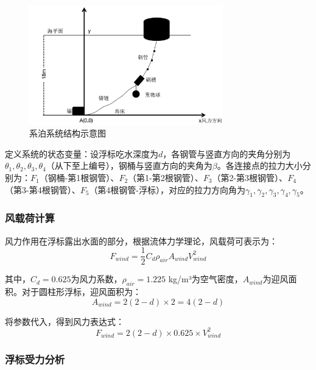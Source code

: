 \documentclass[withoutpreface,bwprint]{cumcmthesis}
\begin{document}
\begin{figure}[H]
\centering
\includegraphics[width=0.75\textwidth]{figures/系泊系统结构示意图.png}
\caption{系泊系统结构示意图}
\label{fig:系统结构}
\end{figure}

定义系统的状态变量：设浮标吃水深度为$d$，各钢管与竖直方向的夹角分别为$\theta_1, \theta_2, \theta_3, \theta_4$（从下至上编号），钢桶与竖直方向的夹角为$\beta$。各连接点的拉力大小分别为：$F_1$（钢桶-第1根钢管）、$F_2$（第1-第2根钢管）、$F_3$（第2-第3根钢管）、$F_4$（第3-第4根钢管）、$F_5$（第4根钢管-浮标），对应的拉力方向角为$\gamma_1, \gamma_2, \gamma_3, \gamma_4, \gamma_5$。

\subsubsection{风载荷计算}

风力作用在浮标露出水面的部分，根据流体力学理论，风载荷可表示为：
\begin{equation}
\label{eq:风力}
F_{wind} = \frac{1}{2}C_d \rho_{air} A_{wind} V_{wind}^2
\end{equation}

其中，$C_d=0.625$为风力系数，$\rho_{air}=1.225$ kg/m³为空气密度，$A_{wind}$为迎风面积。对于圆柱形浮标，迎风面积为：
\begin{equation}
\label{eq:迎风面积}
A_{wind} = 2(2-d) \times 2 = 4(2-d)
\end{equation}

将参数代入，得到风力表达式：
\begin{equation}
\label{eq:风力公式}
F_{wind} = 2(2-d) \times 0.625 \times V_{wind}^2
\end{equation}

\subsubsection{浮标受力分析}
\end{document}
